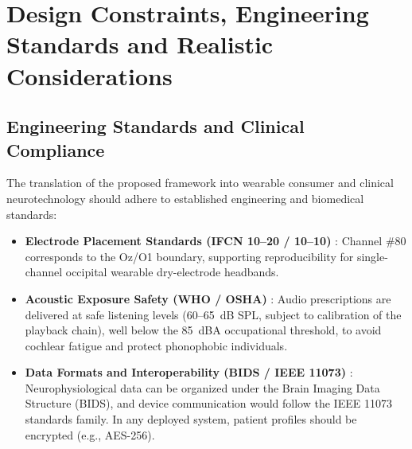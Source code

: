 \documentclass[12pt, a4paper]{report}
\begin{document}
\chapter{Design Constraints, Engineering Standards and Realistic Considerations}
\label{ch:design_constraints}

\section{Engineering Standards and Clinical Compliance}
\label{sec:standards_compliance}
The translation of the proposed framework into wearable consumer and clinical neurotechnology should adhere to established engineering and biomedical standards:
\begin{itemize}
    \item \textbf{Electrode Placement Standards (IFCN 10--20 / 10--10)} \cite{Klem1999}: Channel \#80 corresponds to the Oz/O1 boundary, supporting reproducibility for single-channel occipital wearable dry-electrode headbands.
    \item \textbf{Acoustic Exposure Safety (WHO / OSHA)} \cite{He2023}: Audio prescriptions are delivered at safe listening levels (60--65~dB SPL, subject to calibration of the playback chain), well below the 85~dBA occupational threshold, to avoid cochlear fatigue and protect phonophobic individuals.
    \item \textbf{Data Formats and Interoperability (BIDS / IEEE 11073)} \cite{Muhammad2023,Petrusic2025}: Neurophysiological data can be organized under the Brain Imaging Data Structure (BIDS), and device communication would follow the IEEE 11073 standards family. In any deployed system, patient profiles should be encrypted (e.g., AES-256).
\end{itemize}
\end{document}
